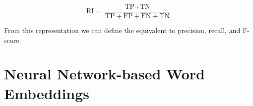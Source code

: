 \begin{equation}
    \text{RI} = \frac{ \text{TP} + \text{TN} }{ \text{TP} + \text{FP} + \text{FN} + \text{TN}}
\end{equation}

From this representation we can define the equivalent to precision, recall, and
F-score.

\section{Neural Network-based Word Embeddings}